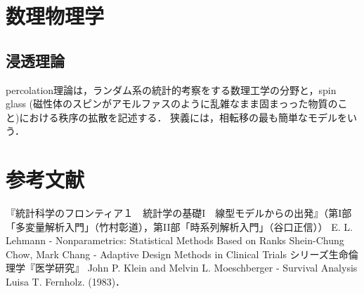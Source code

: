 \documentclass[uplatex,dvipdfmx]{jsreport}
\begin{document}
\chapter{数理物理学}



\section{浸透理論}

\begin{tcolorbox}[colframe=ForestGreen, colback=ForestGreen!10!white,breakable,colbacktitle=ForestGreen!40!white,coltitle=black,fonttitle=\bfseries\sffamily,
title=]
    percolation理論は，ランダム系の統計的考察をする数理工学の分野と，spin glass (磁性体のスピンがアモルファスのように乱雑なまま固まっった物質のこと)における秩序の拡散を記述する．
    狭義には，相転移の最も簡単なモデルをいう．
\end{tcolorbox}

\chapter{参考文献}

\begin{thebibliography}{99}
    『統計科学のフロンティア１　統計学の基礎I　線型モデルからの出発』（第I部「多変量解析入門」（竹村彰道），第II部「時系列解析入門」（谷口正信））
    E. L. Lehmann - Nonparametrics: Statistical Methods Based on Ranks
    Shein-Chung Chow, Mark Chang - Adaptive Design Methods in Clinical Trials
    シリーズ生命倫理学『医学研究』
    John P. Klein and Melvin L. Moeschberger - Survival Analysis
    Luisa T. Fernholz.  (1983)．
\end{thebibliography}
\end{document}
